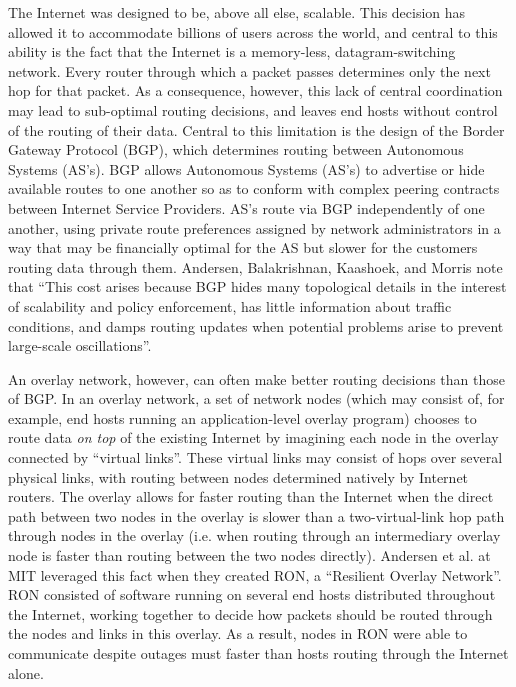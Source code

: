 \documentclass[pageno]{jpaper}
\begin{document}
The Internet was designed to be, above all else, scalable. This decision
has allowed it to accommodate billions of users across the world, and central
to this ability is the fact that the Internet is a memory-less, datagram-switching
network. Every router through which a packet passes determines only the next
hop for that packet. As a consequence, however, this lack of central coordination
may lead to sub-optimal routing decisions, and leaves end hosts without control of the
routing of their data.  Central to this limitation is the design of 
the Border Gateway Protocol (BGP), which determines routing between Autonomous
Systems (AS's).  BGP allows Autonomous Systems (AS's) to advertise or hide available routes to one another so as to conform with complex peering contracts between Internet Service Providers.  AS's route via BGP independently of one another, using private route preferences assigned by network administrators in a way that may be financially optimal for the AS but slower for the customers routing data through them.
Andersen, Balakrishnan, Kaashoek, and Morris note that 
``This cost arises because BGP hides many topological details in the interest of
scalability and policy enforcement, has little information about traffic conditions,
and damps routing updates when potential problems arise to prevent large-scale
oscillations''\cite{ron}.  

An overlay network, however, can often make better routing decisions than those of BGP.
In an overlay network, a set of network nodes (which may consist of, for example, end hosts running 
an application-level overlay program) chooses to route data {\it on top} 
of the existing Internet by imagining each node in the overlay connected by ``virtual links''.  These virtual
links may consist of hops over several physical links, with routing between nodes determined natively by
Internet routers.  The overlay allows for faster routing than the Internet when the direct path between
two nodes in the overlay is slower than a two-virtual-link hop path through nodes in the overlay (i.e. when 
routing through an intermediary overlay node is faster than routing between the two nodes directly).
Andersen et al. at MIT leveraged this fact when they created RON\cite{ron}, a 
``Resilient Overlay Network''.  RON consisted of software running on several end 
hosts distributed throughout the Internet, working
together to decide how packets should be routed through the nodes and links in this
overlay. As a result, nodes in RON were able to communicate despite outages 
must faster than hosts routing through the Internet alone.
\end{document}
